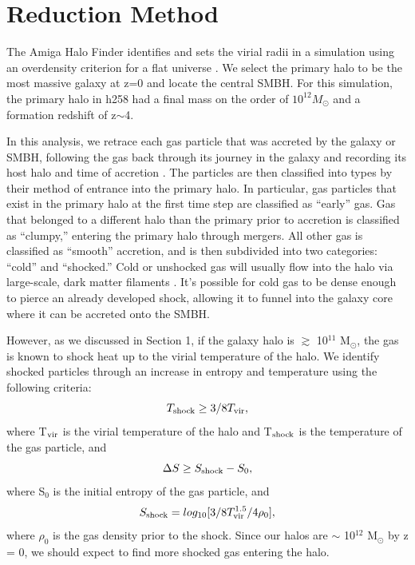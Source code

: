 \documentclass[manuscript]{aastex}
\begin{document}

\section{Reduction Method}\label{redux}

The Amiga Halo Finder identifies and sets the virial radii in a simulation using an overdensity criterion for a flat universe \citep{Knebe2001,Knollmann2009,Gill2004}. We select the primary halo to be the most massive galaxy at z=0 and locate the central SMBH. For this simulation, the primary halo in h258 had a final mass on the order of $10^{12} M_{\odot}$ and a formation redshift of z$\sim$4.  

In this analysis, we retrace each gas particle that was accreted by the galaxy or SMBH, following the gas back through its journey in the galaxy and recording its host halo and time of accretion \citep{Brooks2009}. The particles are then classified into types by their method of entrance into the primary halo. In particular, gas particles that exist in the primary halo at the first time step are classified as ``early'' gas. Gas that belonged to a different halo than the primary prior to accretion is classified as ``clumpy,'' entering the primary halo through mergers. All other gas is classified as ``smooth'' accretion, and is then subdivided into two categories: ``cold'' and ``shocked.'' Cold or unshocked gas will usually flow into the halo via large-scale, dark matter filaments \citep{Bellovary2013}. It's possible for cold gas to be dense enough to pierce an already developed shock, allowing it to funnel into the galaxy core where it can be accreted onto the SMBH.

However, as we discussed in Section 1, if the galaxy halo is $\gtrsim$ 10$^{11}$ M$_{\odot} $, the gas is known to shock heat up to the virial temperature of the halo. We identify shocked particles through an increase in entropy and temperature using the following criteria:
\begin{equation}
T_{\rm shock} \geq 3/8 T_{\rm vir},
\end{equation}
where T$_{\rm vir}$ is the virial temperature of the halo and T$_{\rm shock}$ is the temperature of the gas particle, and 
\begin{equation}
\Delta S \geq S_{\rm shock} - S_0,
\end{equation}
where S$_0$ is the initial entropy of the gas particle, and 
\begin{equation}
S_{\rm shock} = log_{10}[3/8 T_{\rm vir}^{1.5}/4 \rho_0],
\end{equation}
where $\rho_0$ is the gas density prior to the shock. Since our halos are $\sim$ 10$^{12}$ M$_{\odot} $ by z = 0, we should expect to find more shocked gas entering the halo.
\end{document}
